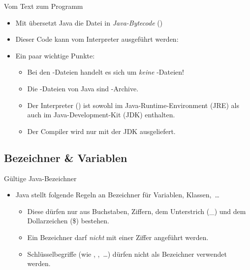 \begin{frame}{Vom Text zum Programm}
    \begin{itemize}[<+(1)->]
        \widei
        \item Mit  übersetzt Java die Datei in \emph{Java-Bytecode}\pause{} ()
        \item Dieser Code kann vom Interpreter  ausgeführt werden:\pause{} 
        \item Ein paar wichtige Punkte: \begin{itemize}
            \item Bei den -Dateien handelt es sich um \emph{keine} -Dateien!
            \item Die -Dateien von Java sind -Archive.
            \item Der Interpreter () ist sowohl im Java-Runtime-Environment (JRE) als auch im Java-Development-Kit (JDK) enthalten.
            \item Der Compiler wird nur mit der JDK ausgeliefert.
        \end{itemize}
    \end{itemize}
\end{frame}

\subsection{Bezeichner \& Variablen}

\begin{frame}{Gültige Java-Bezeichner}
    \begin{itemize}[<+(1)->]
        \widei
        \item Java stellt folgende Regeln an Bezeichner für Variablen, Klassen,~\ldots \begin{itemize}
            \item Diese dürfen nur aus Buchstaben, Ziffern, dem Unterstrich (\_) und dem Dollarzeichen (\$) bestehen.
            \item Ein Bezeichner darf \emph{nicht} mit einer Ziffer angeführt werden.
            \item Schlüsselbegriffe (wie , ,~\ldots) dürfen nicht als Bezeichner verwendet werden.
        \end{itemize}
    \end{itemize}
\end{frame}

